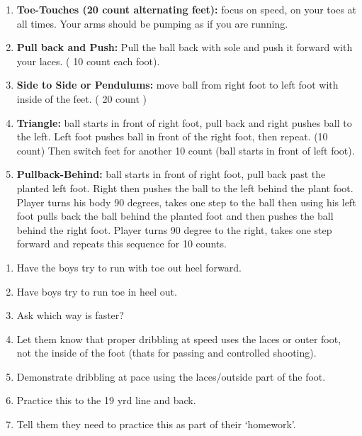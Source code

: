 \documentclass[10pt,letterpaper]{article}
\newenvironment{evenBlock}[1]{%
    \tcolorbox[beamer,%
    noparskip,breakable,
    colback=LightGreen,colframe=DarkGreen,%
    colbacklower=LimeGreen!75!LightGreen,%
    title=#1]}%
    {\endtcolorbox}
\newenvironment{oddBlock}[1]{%
    \tcolorbox[beamer,%
    noparskip,breakable,
    colback=LightBlue,colframe=DarkBlue,%
    colbacklower=DarkBlue!75!LightBlue,%
    title=#1]}%
    {\endtcolorbox}
\begin{document}
\begin{evenBlock}{Coerver Touches - Intro (15 min) }
    \begin{enumerate}
        \item \textbf{Toe-Touches (20 count alternating feet):} focus on speed, on your toes at all times.  Your arms should be pumping as if you are running.
        \item \textbf{Pull back and Push:} Pull the ball back with sole and push it forward with your laces. ( 10 count each foot).
        \item \textbf{Side to Side or Pendulums:} move ball from right foot to left foot with inside of the feet. ( 20 count )
        \item \textbf{Triangle:} ball starts in front of right foot, pull back and right pushes ball to the left.  Left foot pushes ball in front of the right foot, then repeat. (10 count)  Then switch feet for another 10 count (ball starts in front of left foot).
        \item \textbf{Pullback-Behind:} ball starts in front of right foot, pull back past the planted left foot.  Right then pushes the ball to the left behind the plant foot.  Player turns his body 90 degrees, takes one step to the ball then using his left foot pulls back the ball behind the planted foot and then pushes the ball behind the right foot.  Player turns 90 degree to the right, takes one step forward and repeats this sequence for 10 counts.
    \end{enumerate}
\end{evenBlock}

\begin{oddBlock}{Dribbling at Pace - Intro (10 min) }
    \begin{enumerate}
        \item Have the boys try to run with toe out heel forward.
        \item Have boys try to run toe in heel out.
        \item Ask which way is faster?
        \item Let them know that proper dribbling at speed uses the laces or outer foot, not the inside of the foot (thats for passing and controlled shooting).
        \item Demonstrate dribbling at pace using the laces/outside part of the foot.
        \item Practice this to the 19 yrd line and back.
        \item Tell them they need to practice this as part of their `homework'. 
    \end{enumerate}
\end{oddBlock}
\end{document}
